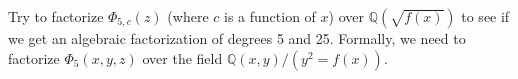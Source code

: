 \documentclass{amsart}
\theoremstyle{plain}
\theoremstyle{definition}
\theoremstyle{remark}
\newcommand{\Q}{\mathbb{Q}}
\begin{document}
Try to factorize $\Phi_{5, c}(z)$ (where $c$ is a function of $x$)
over $\Q(\sqrt{f(x)})$ to see if we get an algebraic factorization of
degrees 5 and 25. Formally, we need to factorize $\Phi_5(x, y, z)$
over the field $\Q(x, y)/(y^2 = f(x))$.
\end{document}

